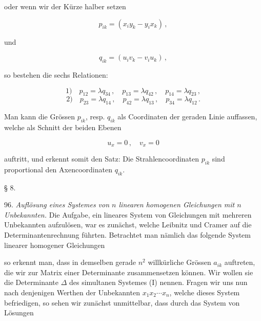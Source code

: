 oder wenn wir der K\"urze halber setzen

\[
p_{ik} = (x_i y_k - y_i x_k)\,,
\]

und

\[
q_{ik} = (u_i v_k - v_i u_k)\,,
\]

so bestehen die sechs Relationen:

\[
1)\quad p_{12} = \lambda q_{34}\,,\quad p_{13} = \lambda q_{42}\,,\quad p_{14} = \lambda q_{23}\,,
\]
\[
2)\quad p_{23} = \lambda q_{14}\,,\quad p_{42} = \lambda q_{13}\,,\quad p_{34} = \lambda q_{12}\,.
\]

Man kann die Gr\"ossen $p_{ik}$, resp. $q_{ik}$ als Coordinaten der geraden Linie auffassen, welche als Schnitt der beiden Ebenen

\[
u_x = 0\,,\quad v_x = 0
\]

auftritt, und erkennt somit den Satz: Die Strahlencoordinaten $p_{ik}$ sind proportional den Axencoordinaten $q_{ik}$.




§ 8. 

96. \textit{Auflösung eines Systemes von $n$ linearen homogenen Gleichungen
mit $n$ Unbekannten.} Die Aufgabe, ein lineares System von Gleichungen
mit mehreren Unbekannten aufzulösen, war es zunächst, welche Leibnitz
und Cramer auf die Determinantenrechnung führten. Betrachtet man
nämlich das folgende System linearer homogener Gleichungen


so erkennt man, dass in demselben gerade $n^2$ willkürliche Grössen $a_{ik}$
auftreten, die wir zur Matrix einer Determinante zusammensetzen können.
Wir wollen sie die Determinante $\Delta$ des simultanen Systemes (I)
nennen. Fragen wir uns nun nach denjenigen Werthen der Unbekannten
$x_1x_2\cdots x_n$, welche dieses System befriedigen, so sehen wir zunächst
unmittelbar, dass durch das System von Lösungen


